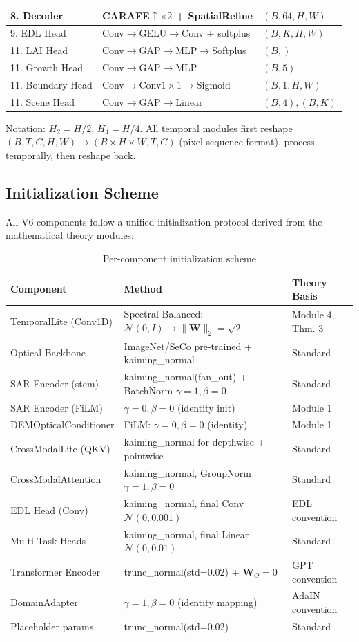 \begin{table}[h]
\begin{tabular}{lll}
8. Decoder & CARAFE$\uparrow\times2$ + SpatialRefine & $(B, 64, H, W)$ \\
\midrule
9. EDL Head & Conv$\to$GELU$\to$Conv + softplus & $(B, K, H, W)$ \\
11. LAI Head & Conv$\to$GAP$\to$MLP$\to$Softplus & $(B,)$ \\
11. Growth Head & Conv$\to$GAP$\to$MLP & $(B, 5)$ \\
11. Boundary Head & Conv$\to$Conv$1\times1$$\to$Sigmoid & $(B, 1, H, W)$ \\
11. Scene Head & Conv$\to$GAP$\to$Linear & $(B, 4), (B, K)$ \\
\bottomrule
\end{tabular}
\end{table}

Notation: $H_2 = H/2$, $H_4 = H/4$. All temporal modules first reshape
$(B, T, C, H, W) \to (B \times H \times W, T, C)$ (pixel-sequence format),
process temporally, then reshape back.

\subsection{Initialization Scheme}

All V6 components follow a unified initialization protocol derived from the
mathematical theory modules:

\begin{table}[h]
\centering
\caption{Per-component initialization scheme}
\begin{tabular}{lll}
\toprule
\textbf{Component} & \textbf{Method} & \textbf{Theory Basis} \\
\midrule
TemporalLite (Conv1D) & Spectral-Balanced: $\mathcal{N}(0,I) \to \|\mathbf{W}\|_2 = \sqrt{2}$ & Module 4, Thm. 3 \\
Optical Backbone & ImageNet/SeCo pre-trained + kaiming\_normal & Standard \\
SAR Encoder (stem) & kaiming\_normal(fan\_out) + BatchNorm $\gamma=1, \beta=0$ & Standard \\
SAR Encoder (FiLM) & $\gamma=0, \beta=0$ (identity init) & Module 1 \\
DEMOpticalConditioner & FiLM: $\gamma=0, \beta=0$ (identity) & Module 1 \\
CrossModalLite (QKV) & kaiming\_normal for depthwise + pointwise & Standard \\
CrossModalAttention & kaiming\_normal, GroupNorm $\gamma=1, \beta=0$ & Standard \\
EDL Head (Conv) & kaiming\_normal, final Conv $\mathcal{N}(0, 0.001)$ & EDL convention \\
Multi-Task Heads & kaiming\_normal, final Linear $\mathcal{N}(0, 0.01)$ & Standard \\
Transformer Encoder & trunc\_normal(std=0.02) + $\mathbf{W}_O = 0$ & GPT convention \\
DomainAdapter & $\gamma=1, \beta=0$ (identity mapping) & AdaIN convention \\
Placeholder params & trunc\_normal(std=0.02) & Standard \\
\bottomrule
\end{tabular}
\end{table}

